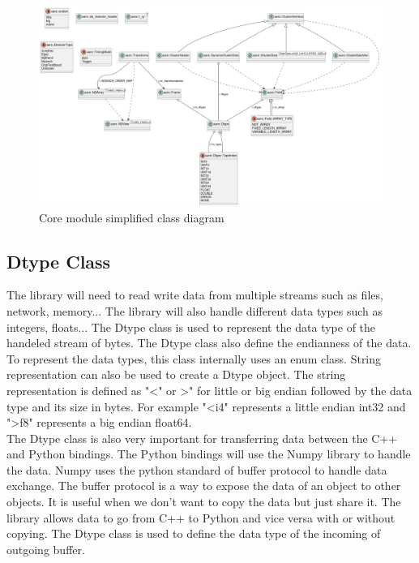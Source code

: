 \begin{spacing}{1.2}
    \begin{figure}
        \centering
        \includegraphics[width=\textwidth]{Chapitre3/figures/core_class_simplified.png}
        \caption{Core module simplified class diagram}
        \label{fig:core_class_diagram}
    \end{figure}
    \subsection{Dtype Class}
    The library will need to read write data from multiple streams such as files, network, memory...
    The library will also handle different data types such as integers, floats... The Dtype class
    is used to represent the data type of the handeled stream of bytes. The Dtype class also
    define the endianness of the data. To represent the data types, this class internally uses an enum
    class. String representation can also be used to create a Dtype object. The string representation
    is defined as "\textless" or \textgreater" for little or big endian followed by the data type and its size in bytes.
    For example "\textless i4" represents a little endian int32 and "\textgreater f8" represents a big endian float64.
    \\

    The Dtype class is also very important for transferring data between the C++ and Python bindings.
    The Python bindings will use the Numpy library to handle the data. Numpy uses the python standard
    of buffer protocol\cite{bufferprotocol} to handle data exchange. The buffer protocol is a way to expose the data of an object
    to other objects. It is useful when we don't want to copy the data but just share it.
    The library allows data to go from C++ to Python and vice versa with or without copying.
    The Dtype class is used to define the data type of the incoming of outgoing buffer.\\


\end{spacing}
